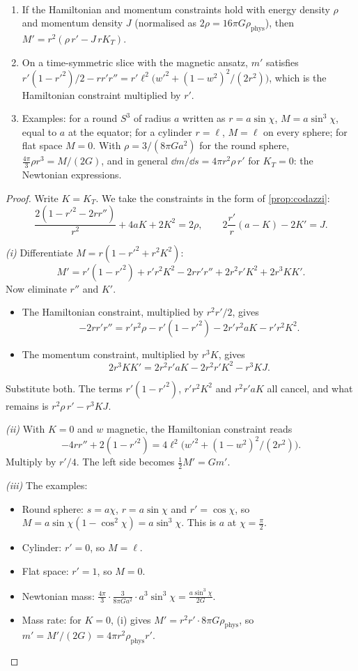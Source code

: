 \begin{proposition}\label{prop:massprime}\ver\
\begin{enumerate}[label=(\roman*)]
\item If the Hamiltonian and momentum constraints hold with energy density $\rho$ and momentum density $J$ (normalised as $2\rho=16\pi G\rho_{\mathrm{phys}}$), then $M'=r^2(\rho\,r'-J\,rK_T)$.
\item On a time-symmetric slice with the magnetic ansatz, $m'$ satisfies $r'(1-r'^2)/2-rr'r''=r'\ell^2\bigl(w'^2+(1-w^2)^2/(2r^2)\bigr)$, which is the Hamiltonian constraint multiplied by $r'$.
\item Examples: for a round $S^3$ of radius $a$ written as $r=a\sin\chi$, $M=a\sin^3\chi$, equal to $a$ at the equator; for a cylinder $r=\ell$, $M=\ell$ on every sphere; for flat space $M=0$. With $\rho=3/(8\pi Ga^2)$ for the round sphere, $\frac{4\pi}3\rho r^3=M/(2G)$, and in general $\dd m/\dd s=4\pi r^2\rho\,r'$ for $K_T=0$: the Newtonian expressions.
\end{enumerate}
\end{proposition}
\begin{proof}
Write $K=K_T$. We take the constraints in the form of \cref{prop:codazzi}:
\[
\frac{2(1-r'^2-2rr'')}{r^2}+4aK+2K^2=2\rho,\qquad 2\frac{r'}r(a-K)-2K'=J .
\]

\emph{(i)} Differentiate $M=r(1-r'^2+r^2K^2)$:
\[
M'=r'(1-r'^2)+r'r^2K^2-2rr'r''+2r^2r'K^2+2r^3KK' .
\]
Now eliminate $r''$ and $K'$.
\begin{itemize}[nosep]
\item The Hamiltonian constraint, multiplied by $r^2r'/2$, gives
\[
-2rr'r''=r'r^2\rho-r'(1-r'^2)-2r'r^2aK-r'r^2K^2 .
\]
\item The momentum constraint, multiplied by $r^3K$, gives
\[
2r^3KK'=2r^2r'aK-2r^2r'K^2-r^3KJ .
\]
\end{itemize}
Substitute both. The terms $r'(1-r'^2)$, $r'r^2K^2$ and $r^2r'aK$ all cancel, and what remains is $r^2\rho\,r'-r^3KJ$.

\emph{(ii)} With $K=0$ and $w$ magnetic, the Hamiltonian constraint reads
\[
-4rr''+2(1-r'^2)=4\ell^2\bigl(w'^2+(1-w^2)^2/(2r^2)\bigr).
\]
Multiply by $r'/4$. The left side becomes $\frac12M'=Gm'$.

\emph{(iii)} The examples:
\begin{itemize}[nosep]
\item Round sphere: $s=a\chi$, $r=a\sin\chi$ and $r'=\cos\chi$, so $M=a\sin\chi(1-\cos^2\chi)=a\sin^3\chi$. This is $a$ at $\chi=\frac\pi2$.
\item Cylinder: $r'=0$, so $M=\ell$.
\item Flat space: $r'=1$, so $M=0$.
\item Newtonian mass: $\frac{4\pi}3\cdot\frac3{8\pi Ga^2}\cdot a^3\sin^3\chi=\frac{a\sin^3\chi}{2G}$.
\item Mass rate: for $K=0$, (i) gives $M'=r^2r'\cdot8\pi G\rho_{\mathrm{phys}}$, so $m'=M'/(2G)=4\pi r^2\rho_{\mathrm{phys}}r'$.
\end{itemize}
\end{proof}


